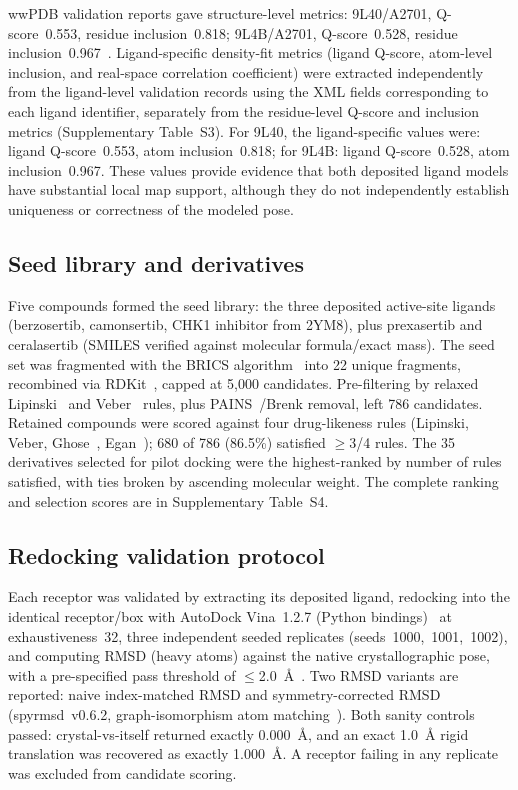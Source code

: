 \documentclass[global,twocolumn]{svjour}
\begin{document}
wwPDB validation reports gave structure-level metrics: 9L40/A2701, Q-score~0.553,
residue inclusion~0.818; 9L4B/A2701, Q-score~0.528, residue
inclusion~0.967~\cite{pintilie2020}. Ligand-specific density-fit metrics (ligand
Q-score, atom-level inclusion, and real-space correlation coefficient) were
extracted independently from the ligand-level validation records using the XML
fields corresponding to each ligand identifier, separately from the
residue-level Q-score and inclusion metrics (Supplementary Table~S3). For
9L40, the ligand-specific values were: ligand Q-score~0.553, atom
inclusion~0.818; for 9L4B: ligand Q-score~0.528, atom inclusion~0.967. These
values provide evidence that both deposited ligand models have substantial
local map support, although they do not independently establish uniqueness or
correctness of the modeled pose.

\subsection{Seed library and derivatives}

Five compounds formed the seed library: the three deposited active-site
ligands (berzosertib, camonsertib, CHK1 inhibitor from 2YM8), plus prexasertib
and ceralasertib (SMILES verified against molecular formula/exact mass). The
seed set was fragmented with the BRICS algorithm~\cite{degen2008} into 22
unique fragments, recombined via RDKit~\cite{rdkit}, capped at 5,000
candidates. Pre-filtering by relaxed Lipinski~\cite{lipinski1997} and
Veber~\cite{veber2002} rules, plus PAINS~\cite{baell2010}/Brenk removal, left
786 candidates. Retained compounds were scored against four drug-likeness rules
(Lipinski, Veber, Ghose~\cite{ghose1999}, Egan~\cite{egan2000}); 680 of 786
(86.5\%) satisfied $\ge$3/4 rules. The 35 derivatives selected for pilot
docking were the highest-ranked by number of rules satisfied, with ties broken
by ascending molecular weight. The complete ranking and selection scores are in
Supplementary Table~S4.

\subsection{Redocking validation protocol}

Each receptor was validated by extracting its deposited ligand, redocking into
the identical receptor/box with AutoDock Vina~1.2.7
(Python bindings)~\cite{trott2010} at exhaustiveness~32, three independent
seeded replicates (seeds~1000,~1001,~1002), and computing RMSD (heavy atoms)
against the native crystallographic pose, with a pre-specified pass threshold
of $\le$2.0~\AA{}~\cite{hartshorn2007}. Two RMSD variants are reported: naive
index-matched RMSD and symmetry-corrected RMSD (spyrmsd~v0.6.2,
graph-isomorphism atom matching~\cite{meli2020}). Both sanity controls
passed: crystal-vs-itself returned exactly 0.000~\AA{}, and an exact
1.0~\AA{} rigid translation was recovered as exactly 1.000~\AA{}. A receptor
failing in any replicate was excluded from candidate scoring.
\end{document}

